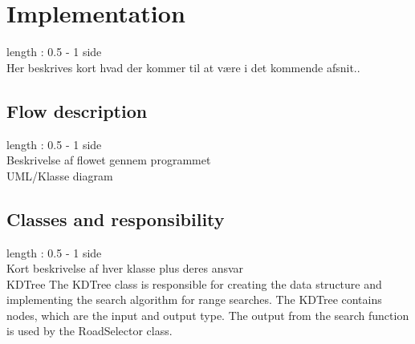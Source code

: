 \documentclass[a4paper,10pt,titlepage]{article}
\begin{document}
	\section{Implementation}
		length : 0.5 - 1 side\\
		Her beskrives kort hvad der kommer til at være i det kommende afsnit..
		
		\subsection{Flow description}
			length : 0.5 - 1 side\\
			Beskrivelse af flowet gennem programmet\\
			UML/Klasse diagram\\
			
		\subsection{Classes and responsibility}
			length : 0.5 - 1 side\\
			Kort beskrivelse af hver klasse plus deres ansvar\\
			KDTree
			The KDTree class is responsible for creating the data structure and implementing the search algorithm for range searches. The KDTree contains nodes, which are the input and output type. The output from the search function is used by the RoadSelector class. 
			
\end{document}
